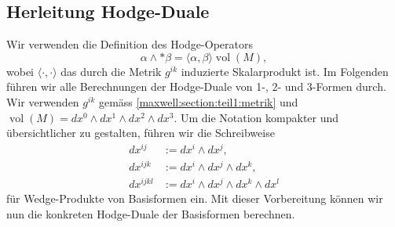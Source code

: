 \begin{comment}
\vspace{1em}
\noindent
Zusätzlich gruppieren wir die Berechnungen nach der Anzahl der enthaltenen Zeitkomponenten \( dx^0 \). Dies betont die geometrische Rolle der Zeitrichtung in der Minkowski-Metrik und hilft dabei, Muster und Symmetrien leichter zu erkennen:
\begin{itemize}
	\item Bei 1-Formen unterscheiden wir zwischen rein zeitartigen (\( dx^0 \)) und rein raumartigen (\( dx^i, \, i > 0 \)) Formen.
	\item Bei 2-Formen ergeben sich drei Typen:
	\begin{itemize}
		\item Formen der Art \( dx^{0i} \), also mit einer Zeit- und einer Raumkomponente,
		\item rein raumartige Formen \( dx^{ij} \),
		\item (rein zeitartige 2-Formen wie \( dx^{00} \) sind ausgeschlossen, da \( dx^0 \wedge dx^0 = 0 \)).
	\end{itemize}
	\item Bei 3-Formen ergibt sich entsprechend eine Aufteilung in:
	\begin{itemize}
		\item zwei Raum- und eine Zeitkomponente (\( dx^{0ij} \)),
		\item rein raumartige Formen (\( dx^{ijk} \)).
	\end{itemize}
\end{itemize}

\vspace{1em}
\noindent
Mit dieser Vorbereitung können wir nun die konkreten Hodge-Dualen der Basisformen systematisch berechnen.
\end{comment}

\subsection{Herleitung Hodge-Duale}
Wir verwenden die Definition des Hodge-Operators
\begin{equation*}
	\alpha \wedge \ast \beta = \langle \alpha, \beta \rangle \operatorname{vol}(M),
\end{equation*}
wobei $\langle \cdot , \cdot \rangle$ das durch die Metrik $g^{ik}$ induzierte Skalarprodukt ist.
Im Folgenden führen wir alle Berechnungen der Hodge-Duale von 1-, 2- und 3-Formen durch.
Wir verwenden $g^{ik}$ gemäss \eqref{maxwell:section:teil1:metrik} und $\operatorname{vol}(M) = dx^0 \wedge dx^1 \wedge dx^2 \wedge dx^3$.
Um die Notation kompakter und übersichtlicher zu gestalten, führen wir die Schreibweise 
\begin{align*}
	dx^{ij} &:= dx^i \wedge dx^j, \\
	dx^{ijk} &:= dx^i \wedge dx^j \wedge dx^k, \\
	dx^{ijkl} & := dx^i \wedge dx^j \wedge dx^k \wedge dx^l
\end{align*}
für Wedge-Produkte von Basisformen ein.
Mit dieser Vorbereitung können wir nun die konkreten Hodge-Duale der Basisformen berechnen.
